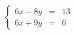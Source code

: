 \documentclass[preview]{standalone}
\begin{document}
\begin{align*}
\left\{ \begin{array}{rcl} 6x - 8y & = & 13 \\ 6x + 9y & = & 6 \end{array} \right.
\end{align*}
\end{document}
